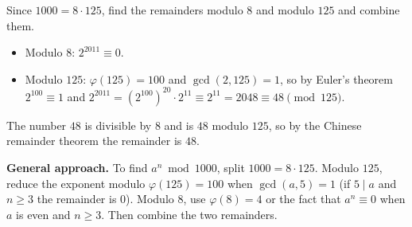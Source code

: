 Since $1000=8\cdot125$, find the remainders modulo $8$ and modulo $125$ and combine them.
\begin{itemize}
\item Modulo $8$: $2^{2011}\equiv0$.
\item Modulo $125$: $\varphi(125)=100$ and $\gcd(2,125)=1$, so by Euler's theorem $2^{100}\equiv1$ and $2^{2011}=\left(2^{100}\right)^{20}\cdot2^{11}\equiv2^{11}=2048\equiv48 \pmod{125}$.
\end{itemize}
The number $48$ is divisible by $8$ and is $48$ modulo $125$, so by the Chinese remainder theorem the remainder is $\boxed{48}$.

\textbf{General approach.} To find $a^n \bmod 1000$, split $1000=8\cdot125$. Modulo $125$, reduce the exponent modulo $\varphi(125)=100$ when $\gcd(a,5)=1$ (if $5\mid a$ and $n\ge3$ the remainder is $0$). Modulo $8$, use $\varphi(8)=4$ or the fact that $a^n\equiv0$ when $a$ is even and $n\ge3$. Then combine the two remainders.
